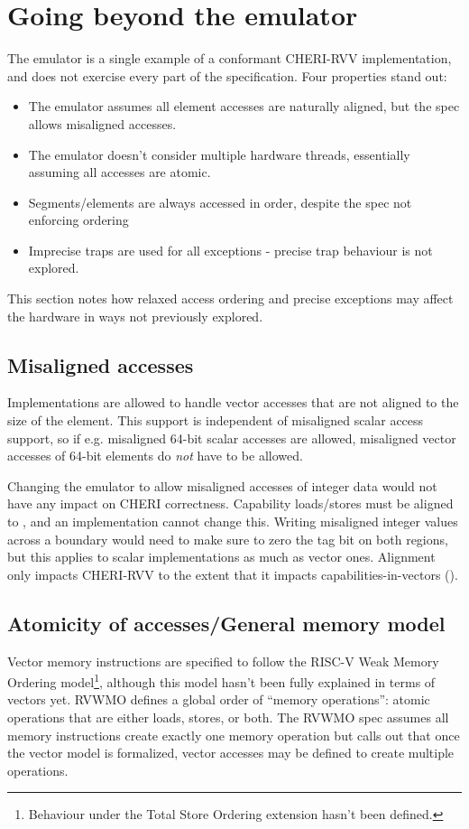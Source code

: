 \section{Going beyond the emulator}
The emulator is a single example of a conformant CHERI-RVV implementation, and does not exercise every part of the specification.
Four properties stand out:
\begin{itemize}
    \item The emulator assumes all element accesses are naturally aligned, but the spec allows misaligned accesses.
    \item The emulator doesn't consider multiple hardware threads, essentially assuming all accesses are atomic.
    \item Segments/elements are always accessed in order, despite the spec not enforcing ordering
    \item Imprecise traps are used for all exceptions - precise trap behaviour is not explored.
\end{itemize}
This section notes how relaxed access ordering and precise exceptions may affect the hardware in ways not previously explored.

\subsection{Misaligned accesses}
Implementations are allowed to handle vector accesses that are not aligned to the size of the element.
This support is independent of misaligned scalar access support, so if e.g. misaligned 64-bit scalar accesses are allowed, misaligned vector accesses of 64-bit elements do \emph{not} have to be allowed.

Changing the emulator to allow misaligned accesses of integer data would not have any impact on CHERI correctness.
Capability loads/stores must be aligned to , and an implementation cannot change this.
Writing misaligned integer values across a  boundary would need to make sure to zero the tag bit on both regions, but this applies to scalar implementations as much as vector ones.
Alignment only impacts CHERI-RVV to the extent that it impacts capabilities-in-vectors (\todoref{}).

\subsection{Atomicity of accesses/General memory model}
Vector memory instructions are specified to follow the RISC-V Weak Memory Ordering model\footnote{Behaviour under the Total Store Ordering extension hasn't been defined.}, although this model hasn't been fully explained in terms of vectors yet.
RVWMO defines a global order of \enquote{memory operations}: atomic operations that are either loads, stores, or both.
The RVWMO spec assumes all memory instructions create exactly one memory operation but calls out that once the vector model is formalized, vector accesses may be defined to create multiple operations.

